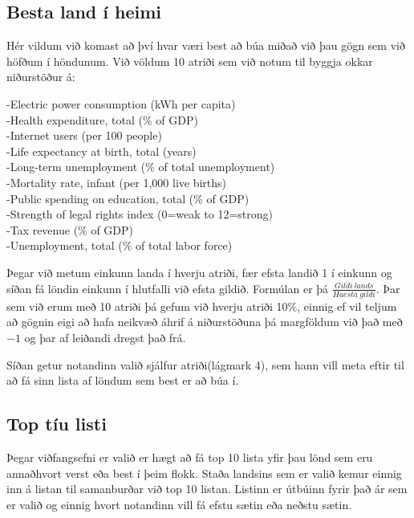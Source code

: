 \documentclass[11pt,a4paper]{amsart}
\theoremstyle{plain}
\theoremstyle{definition}
\theoremstyle{remark}
\begin{document}
\subsection{Besta land í heimi}
Hér vildum við komast að því hvar væri best að búa miðað við þau gögn sem við höfðum í höndunum. Við völdum 10 atriði sem við notum til byggja okkar niðurstöður á:\\
\begin{center}
-Electric power consumption (kWh per capita)\\
-Health expenditure, total (\% of GDP)\\
-Internet users (per 100 people)\\
-Life expectancy at birth, total (years)\\
-Long-term unemployment (\% of total unemployment)\\
-Mortality rate, infant (per 1,000 live births)\\
-Public spending on education, total (\% of GDP)\\
-Strength of legal rights index (0=weak to 12=strong)\\
-Tax revenue (\% of GDP)\\
-Unemployment, total (\% of total labor force)\\
\end{center}
\par
Þegar við metum einkunn landa í hverju atriði, fær efsta landið 1 í einkunn og síðan fá löndin einkunn í hlutfalli við efsta gildið. Formúlan er þá $ \frac{Gildi\ lands}{Haesta\ gildi} $. Þar sem við erum með 10 atriði þá gefum við hverju atriði 10\%, einnig ef vil teljum að gögnin eigi að hafa neikvæð áhrif á niðurstöðuna þá margföldum við það með $ -1 $ og þar af leiðandi dregst það frá.\\\par
Síðan getur notandinn valið sjálfur atriði(lágmark 4), sem hann vill meta eftir til að fá sinn lista af löndum sem best er að búa í. 

\subsection{Top tíu listi}
Þegar viðfangsefni er valið er hægt að fá top 10 lista yfir þau lönd sem eru annaðhvort verst eða best í þeim flokk. Staða landsins sem er valið kemur einnig inn á listan til samanburðar við top 10 listan. Listinn er útbúinn fyrir það ár sem er valið og einnig hvort notandinn vill fá efstu sætin eða neðstu sætin.
\end{document}
